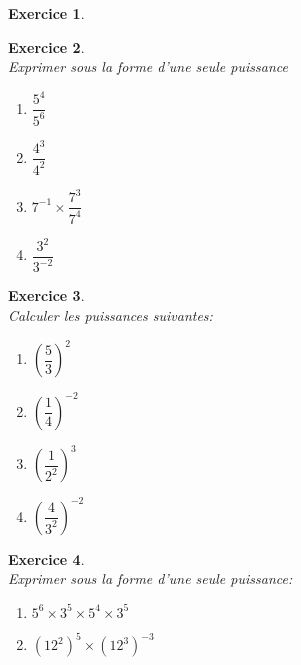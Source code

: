 \documentclass[a4paper,10pt]{article}
\newtheorem{exer}{Exercice}
\begin{document}
\begin{minipage}[t]{1\linewidth}
\begin{minipage}[t]{0.4\linewidth}
\begin{exer}
\begin{multicols}{2}
	
		\end{multicols}
	\end{exer}
	\end{minipage}
	\hfill\vrule\hfill
	\begin{minipage}[t]{0.4\linewidth}
		\raggedright
	
	\begin{exer}\quad\hfill\textbf{}\\
		Exprimer sous la forme d'une seule puissance
		
		
			\begin{multicols}{2}
			\begin{enumerate}
					
					\item $\dfrac{5^4}{5^6}$
					\item $\dfrac{4^3}{4^2}$
					\item $7^{-1}\times \dfrac{7^3}{7^4}  $ 
					\item $\dfrac{3^2}{3^{-2}}$
				\end{enumerate}
				\end{multicols}
	\end{exer}	
		
				

	\begin{exer}\quad\\
		Calculer les puissances suivantes:\hfill\textbf{}\\
	
			
			\begin{multicols}{2}
			\begin{enumerate}
							
							\item $\left(\dfrac{5}{3}\right)^2 $
							\item $\left(\dfrac{1}{4}\right)^{-2}  $
							\item $\left(\dfrac{1}{2^2}\right)^3 $
							\item $\left(\dfrac{4}{3^2}\right)^{-2} $
		\end{enumerate}
		\end{multicols}

	\end{exer}
	
		\begin{exer}\quad\hfill\textbf{}\\
			Exprimer sous la forme d'une seule puissance: \\
	
				\begin{enumerate}
					
				\item $5^{6}\times 3^{5}\times 5^{4}\times 3^{5} $
				
					
				\item $(12^{2})^{5}\times(12^3)^{-3} $
				\end{enumerate} 

			
			
		\end{exer}
	\end{minipage}
\end{minipage}
\hfill\\
\end{document}
